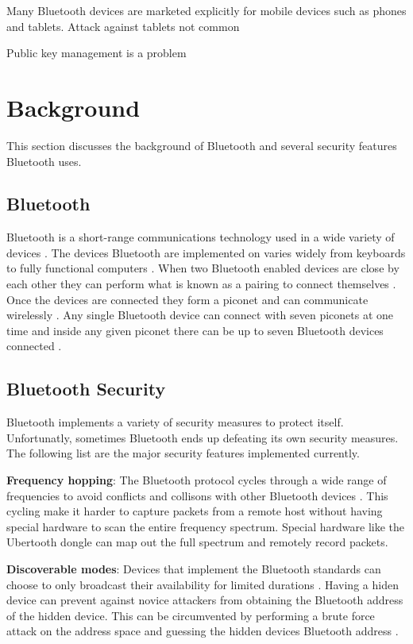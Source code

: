 \documentclass{acm_proc_article-sp}
\begin{document}
Many Bluetooth devices are marketed explicitly for mobile devices such as phones and tablets. 
Attack against tablets not common

Public key management is a problem \cite{almonanimitmssp}

\section{Background}
This section discusses the background of Bluetooth and several security features Bluetooth uses.

\subsection{Bluetooth}
Bluetooth is a short-range communications technology used in a wide variety of devices \cite{bluetooth}. The devices Bluetooth are implemented on varies widely from keyboards to fully functional computers \cite{bluetooth}. When two Bluetooth enabled devices are close by each other they can perform what is known as a pairing to connect themselves \cite{bluetooth}. Once the devices are connected they form a piconet and can communicate wirelessly \cite{bluetooth}. Any single Bluetooth device can connect with seven piconets at one time and inside any given piconet there can be up to seven Bluetooth devices connected \cite{bluetooth}. 

\subsection{Bluetooth Security}
Bluetooth implements a variety of security measures to protect itself. Unfortunatly, sometimes Bluetooth ends up defeating its own security measures. The following list are the major security features implemented currently.

\textbf{Frequency hopping}: The Bluetooth protocol cycles through a wide range of frequencies to avoid conflicts and collisons with other Bluetooth devices \cite{ma2007keystroke}. This cycling make it harder to capture packets from a remote host without having special hardware to scan the entire frequency spectrum. Special hardware like the Ubertooth dongle can map out the full spectrum and remotely record packets.

\textbf{Discoverable modes}: Devices that implement the Bluetooth standards can choose to only broadcast their availability for limited durations \cite{ma2007keystroke}. Having a hiden device can prevent against novice attackers from obtaining the Bluetooth address of the hidden device. This can be circumvented by performing a brute force attack on the address space and guessing the hidden devices Bluetooth address \cite{ma2007keystroke}.
\end{document}
